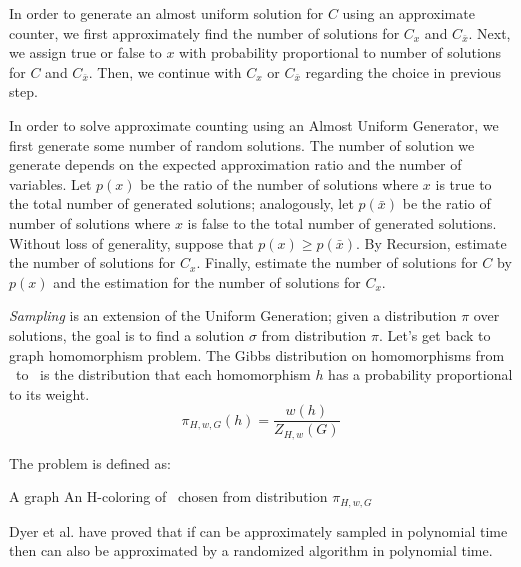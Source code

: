 In order to generate an almost uniform solution for \(C\) using an approximate counter,
we first approximately find the number of solutions for \(C_x\) and \(C_{\bar x}\)\@.
Next, we assign true or false to \(x\) with probability proportional to number of solutions 
for \(C\) and \(C_{\bar x}\)\@. Then, we continue
with \(C_x\) or \(C_{\bar x}\) regarding the choice in previous step.

In order to solve approximate counting using an Almost Uniform Generator, we first
generate some number of random solutions. The number of solution we generate depends 
on the expected approximation ratio and the number of variables.
Let \(p(x)\) be the ratio of the number of solutions
where \(x\) is true to the total number of generated solutions; analogously, let \(p(\bar x)\) be
the ratio of number of solutions where \(x\) is false to the total number of generated solutions.
Without loss of generality, suppose that \(p(x) \ge p(\bar x)\)\@.
By Recursion, estimate the number of solutions for \(C_x\). Finally, estimate 
the number of solutions for \(C\) by \(p(x)\) and the estimation for the 
number of solutions for \(C_x\)\@.

\emph{Sampling} is an extension of the Uniform Generation; given a
distribution \(\pi\) over solutions, the goal is to find a solution \(\sigma \)
from distribution \(\pi\)\@.
Let's get back to graph homomorphism problem. 
The Gibbs distribution on homomorphisms from \mG\ to \mH\ is
the distribution that each homomorphism \(h\) has a probability proportional to its weight.
\[\pi_{H,w,G}(h)=\frac{w(h)}{Z_{H,w}(G)}\]

The  problem is defined as:

\pnndef%
{A graph \mG}
{An H-coloring of \mG\ chosen from distribution \(\pi_{H,w,G}\)}

Dyer et al. \cite{Sampling} have proved that if  can be approximately 
sampled in polynomial time then 
can also be approximated by a randomized algorithm in polynomial time. 

